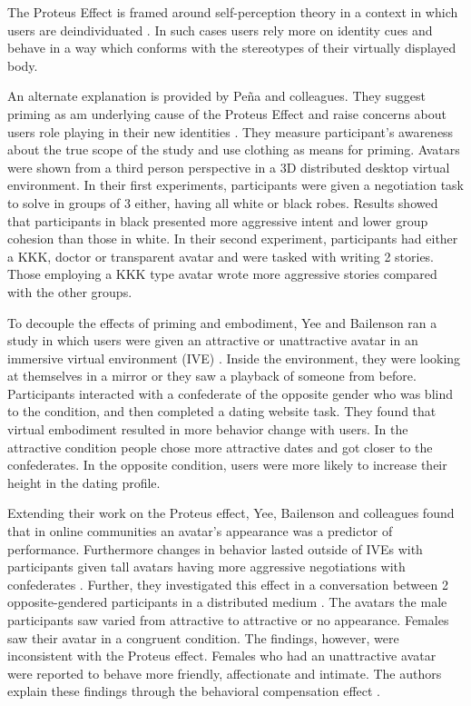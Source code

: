 The Proteus Effect is framed around self-perception theory \cite{bem1972self} in a context in which users are deindividuated \cite{zimbardo1969human}. In such cases users rely more on identity cues and behave in a way which conforms with the stereotypes of their virtually displayed body. 

An alternate explanation is provided by Peña and colleagues. They suggest priming as am underlying cause of the Proteus Effect and raise concerns about users role playing in their new identities \cite{pena2009priming}.
They measure participant’s awareness about the true scope of the study and use clothing as means for priming. Avatars were shown from a third person perspective in a 3D distributed desktop virtual environment. In their first experiments, participants were given a negotiation task to solve in groups of 3 either, having all white or black robes. Results showed that participants in black presented more aggressive intent and lower group cohesion than those in white. In their second experiment, participants had either a KKK, doctor or transparent avatar and were tasked with writing 2 stories. Those employing a KKK type avatar wrote more aggressive stories compared with the other groups.

To decouple the effects of priming and embodiment, Yee and Bailenson ran a study in which users were given an attractive or unattractive avatar in an immersive virtual environment (IVE) \cite{yee2009difference}. Inside the environment, they were looking at themselves in a mirror or they saw a playback of someone from before. Participants interacted with a confederate of the opposite gender who was blind to the condition, and then completed a dating website task.
They found that virtual embodiment resulted in more behavior change with users. In the attractive condition people chose more attractive dates and got closer to the confederates. In the opposite condition, users were more likely to increase their height in the dating profile.

Extending their work on the Proteus effect, Yee, Bailenson and colleagues found that in online communities an avatar’s appearance was a predictor of performance. 
Furthermore changes in behavior lasted outside of IVEs with participants given tall avatars having more aggressive negotiations with confederates \cite{yee2009proteus}. Further, they investigated this effect in a conversation between 2 opposite-gendered participants in a distributed medium \cite{van2013proteus}. The avatars the male participants saw varied from attractive to attractive or no appearance. Females saw their avatar in a congruent condition.
The findings, however, were inconsistent with the Proteus effect. Females who had an unattractive avatar were reported to behave more friendly, affectionate and intimate. The authors explain these findings through the behavioral compensation effect \cite{bond1972effect}.

